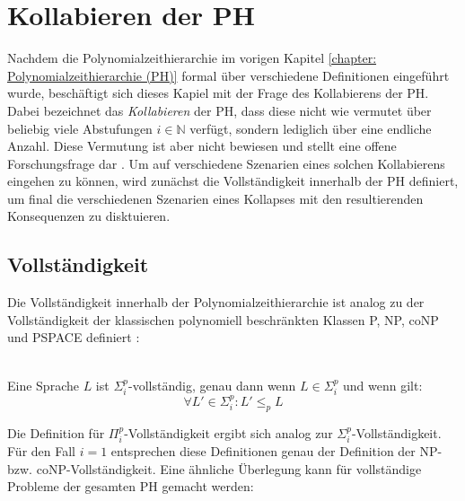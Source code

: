 \chapter{Kollabieren der PH} \label{chapter: Eigenschaften der PH}
Nachdem die Polynomialzeithierarchie im vorigen Kapitel \ref{chapter: Polynomialzeithierarchie (PH)} formal über verschiedene Definitionen eingeführt wurde, beschäftigt sich dieses Kapiel mit der Frage des Kollabierens der PH. Dabei bezeichnet das \emph{Kollabieren} der PH, dass diese nicht wie vermutet über beliebig viele Abstufungen $i \in \mathbb{N}$ verfügt, sondern lediglich über eine endliche Anzahl.
Diese Vermutung ist aber nicht bewiesen und stellt eine offene Forschungsfrage dar \cite{arora_computational_2009}.
Um auf verschiedene Szenarien eines solchen Kollabierens eingehen zu können, wird zunächst die Vollständigkeit innerhalb der PH definiert, um final die verschiedenen Szenarien eines Kollapses mit den resultierenden Konsequenzen zu disktuieren.

\section{Vollständigkeit} \label{section: Vollständige Mengen innerhalb der PH}
Die Vollständigkeit innerhalb der Polynomialzeithierarchie ist analog zu der Vollständigkeit der klassischen polynomiell beschränkten Klassen
P, NP, coNP und PSPACE definiert \cite{arora_computational_2009}:

\begin{definition} \cite[S.99]{arora_computational_2009} \\
    Eine Sprache $L$ ist $\Sigma^p_i$-vollständig, genau dann wenn $L \in \Sigma^p_i$ und wenn gilt: 
    \begin{equation}
        \forall L' \in \Sigma^p_i : L' \leq_p L        
    \end{equation}
\end{definition}

Die Definition für $\Pi^p_i$-Vollständigkeit ergibt sich analog zur $\Sigma^p_i$-Vollständigkeit.
Für den Fall $i = 1$ entsprechen diese Definitionen genau der Definition der NP- bzw. coNP-Vollständigkeit.
Eine ähnliche Überlegung kann für vollständige Probleme der gesamten PH gemacht werden:

